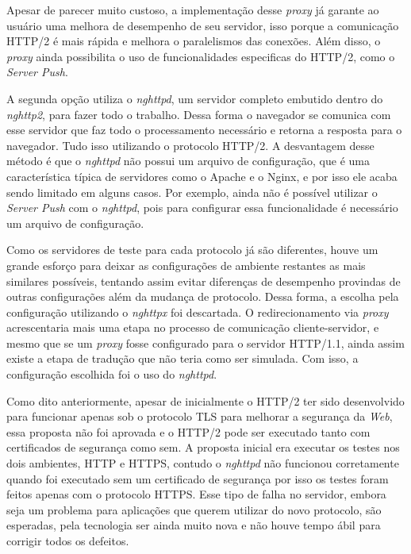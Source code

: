 Apesar de parecer muito custoso, a implementação desse \textit{proxy} já garante ao usuário uma melhora de desempenho de seu servidor, isso porque a comunicação HTTP/2 é mais rápida e melhora o paralelismos das conexões. Além disso, o \textit{proxy} ainda possibilita o uso de funcionalidades especificas do HTTP/2, como o \textit{Server Push}.

A segunda opção utiliza o \textit{nghttpd}, um servidor completo embutido dentro do \textit{nghttp2}, para fazer todo o trabalho. Dessa forma o navegador se comunica com esse servidor que faz todo o processamento necessário e retorna a resposta para o navegador. Tudo isso utilizando o protocolo HTTP/2. A desvantagem desse método é que o \textit{nghttpd} não possui um arquivo de configuração, que é uma característica típica de servidores como o Apache e o Nginx, e por isso ele acaba sendo limitado em alguns casos. Por exemplo, ainda não é possível utilizar o \textit{Server Push} com o \textit{nghttpd}, pois para configurar essa funcionalidade é necessário um arquivo de configuração.

Como os servidores de teste para cada protocolo já são diferentes, houve um grande esforço para deixar as configurações de ambiente restantes as mais similares possíveis, tentando assim evitar diferenças de desempenho provindas de outras configurações além da mudança de protocolo. Dessa forma, a escolha pela configuração utilizando o \textit{nghttpx} foi descartada. O redirecionamento via \textit{proxy} acrescentaria mais uma etapa no processo de comunicação cliente-servidor, e mesmo que se um \textit{proxy} fosse configurado para o servidor HTTP/1.1, ainda assim existe a etapa de tradução que não teria como ser simulada. Com isso, a configuração escolhida foi o uso do \textit{nghttpd}.

Como dito anteriormente, apesar de inicialmente o HTTP/2 ter sido desenvolvido para funcionar apenas sob o protocolo TLS para melhorar a segurança da \textit{Web}, essa proposta não foi aprovada e o HTTP/2 pode ser executado tanto com certificados de segurança como sem. A proposta inicial era executar os testes nos dois ambientes, HTTP e HTTPS, contudo o \textit{nghttpd} não funcionou corretamente quando foi executado sem um certificado de segurança por isso os testes foram feitos apenas com o protocolo HTTPS. Esse tipo de falha no servidor, embora seja um problema para aplicações que querem utilizar do novo protocolo, são esperadas, pela tecnologia ser ainda muito nova e não houve tempo ábil para corrigir todos os defeitos.

